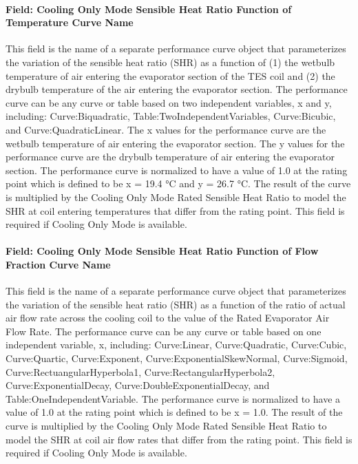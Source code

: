 \paragraph{Field: Cooling Only Mode Sensible Heat Ratio Function of Temperature Curve Name}\label{field-cooling-only-mode-sensible-heat-ratio-function-of-temperature-curve-name}

This field is the name of a separate performance curve object that parameterizes the variation of the sensible heat ratio (SHR) as a function of (1) the wetbulb temperature of air entering the evaporator section of the TES coil and (2) the drybulb temperature of the air entering the evaporator section. The performance curve can be any curve or table based on two independent variables, x and y, including: Curve:Biquadratic, Table:TwoIndependentVariables, Curve:Bicubic, and Curve:QuadraticLinear. The x values for the performance curve are the wetbulb temperature of air entering the evaporator section. The y values for the performance curve are the drybulb temperature of air entering the evaporator section. The performance curve is normalized to have a value of 1.0 at the rating point which is defined to be x = 19.4 °C and y = 26.7 °C. The result of the curve is multiplied by the Cooling Only Mode Rated Sensible Heat Ratio to model the SHR at coil entering temperatures that differ from the rating point. This field is required if Cooling Only Mode is available.

\paragraph{Field: Cooling Only Mode Sensible Heat Ratio Function of Flow Fraction Curve Name}\label{field-cooling-only-mode-sensible-heat-ratio-function-of-flow-fraction-curve-name}

This field is the name of a separate performance curve object that parameterizes the variation of the sensible heat ratio (SHR) as a function of the ratio of actual air flow rate across the cooling coil to the value of the Rated Evaporator Air Flow Rate. The performance curve can be any curve or table based on one independent variable, x, including: Curve:Linear, Curve:Quadratic, Curve:Cubic, Curve:Quartic, Curve:Exponent, Curve:ExponentialSkewNormal, Curve:Sigmoid, Curve:RectuangularHyperbola1, Curve:RectangularHyperbola2, Curve:ExponentialDecay, Curve:DoubleExponentialDecay, and Table:OneIndependentVariable. The performance curve is normalized to have a value of 1.0 at the rating point which is defined to be x = 1.0. The result of the curve is multiplied by the Cooling Only Mode Rated Sensible Heat Ratio to model the SHR at coil air flow rates that differ from the rating point. This field is required if Cooling Only Mode is available.

